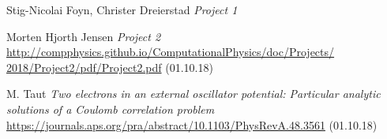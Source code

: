 \documentclass{emulateapj}
\begin{document}




%
%







\begin{acknowledgements}
\end{acknowledgements}


\begin{thebibliography}{9}

 Stig-Nicolai Foyn, Christer Dreierstad
\textit{Project 1}

 Morten Hjorth Jensen
\textit{Project 2}
\url{http://compphysics.github.io/ComputationalPhysics/doc/Projects/
2018/Project2/pdf/Project2.pdf} (01.10.18)

 M. Taut
\textit{Two electrons in an external oscillator potential: Particular analytic solutions of a Coulomb correlation problem}
\url{https://journals.aps.org/pra/abstract/10.1103/PhysRevA.48.3561} (01.10.18)

\end{thebibliography}
\end{document}
